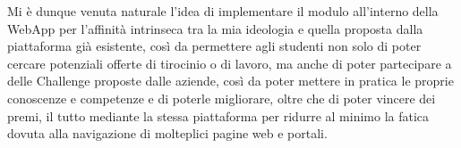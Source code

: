 Mi è dunque venuta naturale l'idea di implementare il modulo all'interno della WebApp per l'affinità intrinseca tra la mia ideologia e quella proposta dalla piattaforma già esistente, così da permettere agli studenti non solo di poter cercare potenziali offerte di tirocinio o di lavoro, ma anche di poter partecipare a delle Challenge proposte dalle aziende, così da poter mettere in pratica le proprie conoscenze e competenze e di poterle migliorare, oltre che di poter vincere dei premi, il tutto mediante la stessa piattaforma per ridurre al minimo la fatica dovuta alla navigazione di molteplici pagine web e portali. 



